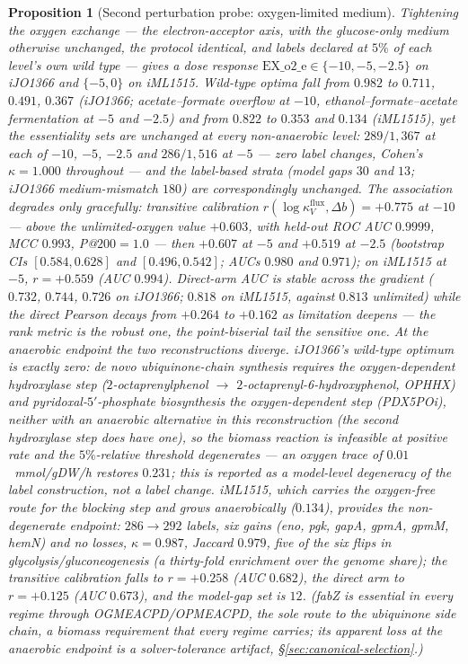 \documentclass[11pt,a4paper]{article}
\theoremstyle{plain}
\newtheorem{proposition}[theorem]{Proposition}
\theoremstyle{definition}
\theoremstyle{remark}
\begin{document}
\begin{proposition}[Second perturbation probe: oxygen-limited medium]
\label{prop:keio-o2-limited}
Tightening the oxygen exchange --- the electron-acceptor axis, with
the glucose-only medium otherwise unchanged, the protocol identical,
and labels declared at $5\%$ of each level's own wild type --- gives
a dose response $\mathrm{EX\_o2\_e}\in\{-10,-5,-2.5\}$ on iJO1366
and $\{-5,0\}$ on iML1515. Wild-type optima fall from $0.982$ to
$0.711$, $0.491$, $0.367$ (iJO1366; acetate--formate overflow at
$-10$, ethanol--formate--acetate fermentation at $-5$ and $-2.5$)
and from $0.822$ to $0.353$ and $0.134$ (iML1515), yet the
essentiality sets are unchanged at every non-anaerobic level:
$289/1{,}367$ at each of $-10$, $-5$, $-2.5$ and $286/1{,}516$ at
$-5$ --- zero label changes, Cohen's $\kappa=1.000$ throughout ---
and the label-based strata (model gaps $30$ and $13$; iJO1366
medium-mismatch $180$) are correspondingly unchanged. The
association degrades only gracefully: transitive calibration
$r(\log\kappa^{\mathrm{flux}}_V,\Delta b)=+0.775$ at $-10$ ---
\emph{above} the unlimited-oxygen value $+0.603$, with held-out ROC
AUC $0.9999$, MCC $0.993$, P@$200=1.0$ --- then $+0.607$ at $-5$
and $+0.519$ at $-2.5$ (bootstrap CIs $[0.584,0.628]$ and
$[0.496,0.542]$; AUCs $0.980$ and $0.971$); on iML1515 at $-5$,
$r=+0.559$ (AUC $0.994$). Direct-arm AUC is stable across the
gradient ($0.732$, $0.744$, $0.726$ on iJO1366; $0.818$ on iML1515,
against $0.813$ unlimited) while the direct Pearson decays from
$+0.264$ to $+0.162$ as limitation deepens --- the rank metric is
the robust one, the point-biserial tail the sensitive one. At the
anaerobic endpoint the two reconstructions diverge. iJO1366's
wild-type optimum is exactly zero: de novo ubiquinone-chain
synthesis requires the oxygen-dependent hydroxylase step
($2$-octaprenylphenol $\to$ $2$-octaprenyl-6-hydroxyphenol, OPHHX)
and pyridoxal-$5'$-phosphate biosynthesis the oxygen-dependent step
(PDX5POi), neither with an anaerobic alternative in this
reconstruction (the second hydroxylase step does have one), so the
biomass reaction is infeasible at positive rate and the
$5\%$-relative threshold degenerates --- an oxygen trace of
$0.01$~mmol/gDW/h restores $0.231$; this is reported as a
model-level degeneracy of the label construction, not a label
change. iML1515, which carries the oxygen-free route for the
blocking step and grows anaerobically ($0.134$), provides the
non-degenerate endpoint: $286\to292$ labels, six gains
(\emph{eno}, \emph{pgk}, \emph{gapA}, \emph{gpmA}, \emph{gpmM},
\emph{hemN}) and no losses, $\kappa=0.987$, Jaccard $0.979$, five
of the six flips in glycolysis/gluconeogenesis (a thirty-fold
enrichment over the genome share); the transitive calibration falls
to $r=+0.258$ (AUC $0.682$), the direct arm to $r=+0.125$ (AUC
$0.673$), and the model-gap set is $12$. (\emph{fabZ} is essential
in every regime through OGMEACPD/OPMEACPD, the sole route to the
ubiquinone side chain, a biomass requirement that every regime
carries; its apparent loss at the anaerobic endpoint is a
solver-tolerance artifact, \S\ref{sec:canonical-selection}.)
\end{proposition}
\end{document}
